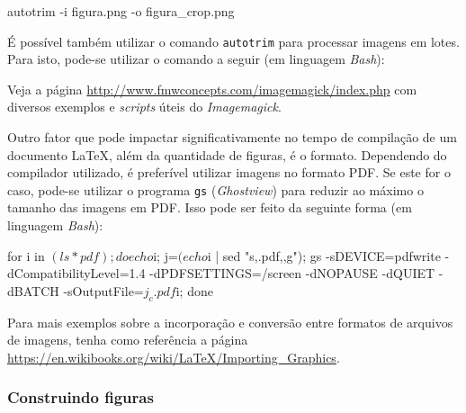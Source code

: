 \begin{meucomando}
autotrim -i figura.png -o figura_crop.png
\end{meucomando}

É possível também utilizar o comando {\tt autotrim} para processar imagens em lotes. Para isto, pode-se utilizar o comando a seguir (em linguagem \textit{Bash}):


\begin{marker}
Veja a página \url{http://www.fmwconcepts.com/imagemagick/index.php} com diversos exemplos e \textit{scripts} úteis do \textit{Imagemagick}.
\end{marker}

Outro fator que pode impactar significativamente no tempo de compilação de um documento \LaTeX{}, além da quantidade de figuras, é o formato. Dependendo do compilador utilizado, é preferível utilizar imagens no formato PDF. Se este for o caso, pode-se utilizar o programa {\tt gs} (\textit{Ghostview}) para reduzir ao máximo o tamanho das imagens em PDF. Isso pode ser feito da seguinte forma (em linguagem \textit{Bash}):


\begin{meucomando}
for i in $(ls *pdf); do echo $i; j=$(echo $i | sed "s,.pdf,,g"); gs -sDEVICE=pdfwrite -dCompatibilityLevel=1.4 -dPDFSETTINGS=/screen -dNOPAUSE -dQUIET -dBATCH -sOutputFile=${j}_c.pdf $i; done
\end{meucomando}

\begin{marker}
Para mais exemplos sobre a incorporação e conversão entre formatos de arquivos de imagens, tenha como referência a página \url{https://en.wikibooks.org/wiki/LaTeX/Importing_Graphics}.
\end{marker}

\subsubsection*{Construindo figuras}
\label{sec:const_docs/figs}

